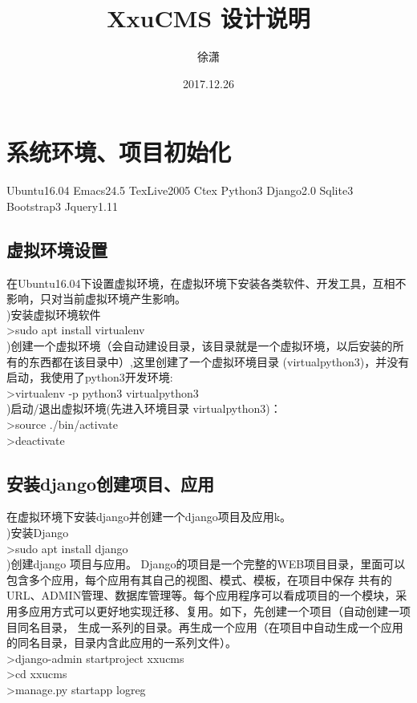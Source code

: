 \documentclass[a4paper]{ctexart}
\author{徐潇}
\title{XxuCMS 设计说明}
\date{2017.12.26}
\begin{document}
  \maketitle  %
  \section{系统环境、项目初始化}
  Ubuntu16.04 Emacs24.5 TexLive2005 Ctex Python3 Django2.0 Sqlite3 Bootstrap3 Jquery1.11
   \subsection{虚拟环境设置}
      在Ubuntu16.04下设置虚拟环境，在虚拟环境下安装各类软件、开发工具，互相不影响，只对当前虚拟环境产生影响。\\    
      )安装虚拟环境软件\\      
      \indent >sudo apt install virtualenv \\
      )创建一个虚拟环境（会自动建设目录，该目录就是一个虚拟环境，以后安装的所有的东西都在该目录中）,这里创建了一个虚拟环境目录
      (virtualpython3)，并没有启动，我使用了python3开发环境:\\
       \indent>virtualenv -p python3 virtualpython3 \\            
       )启动/退出虚拟环境(先进入环境目录 virtualpython3)：\\
       \indent >source ./bin/activate \\
       \indent >deactivate \\
    \subsection{安装django创建项目、应用}
      在虚拟环境下安装django并创建一个django项目及应用k。\\
      )安装Django \\
      \indent >sudo apt install django \\
      )创建django 项目与应用。 Django的项目是一个完整的WEB项目目录，里面可以包含多个应用，每个应用有其自己的视图、模式、模板，在项目中保存
      共有的URL、ADMIN管理、数据库管理等。每个应用程序可以看成项目的一个模块，采用多应用方式可以更好地实现迁移、复用。如下，先创建一个项目（自动创建一项目同名目录，
      生成一系列的目录。再生成一个应用（在项目中自动生成一个应用的同名目录，目录内含此应用的一系列文件）。\\
      \indent >django-admin startproject xxucms \\
      \indent >cd xxucms \\ 
      \indent >manage.py startapp logreg \\
\end{document}
